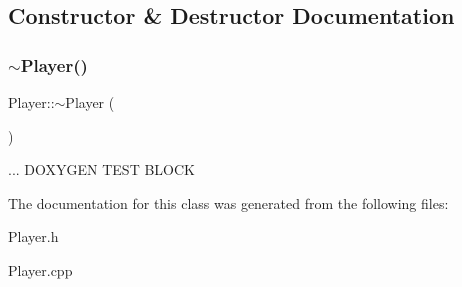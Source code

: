 \subsection{Constructor \& Destructor Documentation}
\mbox{\label{class_player_a749d2c00e1fe0f5c2746f7505a58c062}} 
\subsubsection{\texorpdfstring{$\sim$\+Player()}{~Player()}}
{\footnotesize\ttfamily Player\+::$\sim$\+Player (\begin{DoxyParamCaption}{ }\end{DoxyParamCaption})}

... D\+O\+X\+Y\+G\+EN T\+E\+ST B\+L\+O\+CK

The documentation for this class was generated from the following files\+:\begin{DoxyCompactItemize}
\item 
Player.\+h\item 
Player.\+cpp\end{DoxyCompactItemize}
